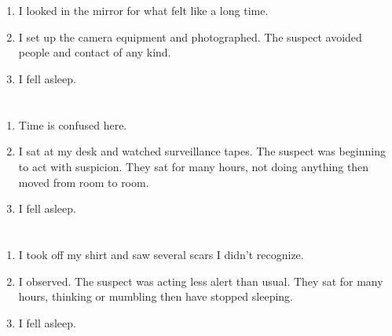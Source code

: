 \documentclass{article}
\begin{document}
    \newpage
    
    \section{}
    
    \begin{enumerate}
    
    \item I looked in the mirror for what felt like a long time.\\
    
    \item I set up the camera equipment and photographed. The suspect avoided people and contact of any kind.\\
    
    \item I fell asleep.\\
    
    \end{enumerate}
     
    \newpage
    
    \section{}
    
    \begin{enumerate}
    
    \item Time is confused here.\\
    
    \item I sat at my desk and watched surveillance tapes. The suspect was beginning to act with suspicion. They sat for many hours, not doing anything then moved from room to room.\\
    
    \item I fell asleep.\\
    
    \end{enumerate}
     
    \newpage
    
    \section{}
    
    \begin{enumerate}
    
    \item I took off my shirt and saw several scars I didn't recognize.\\
    
    \item I observed. The suspect was acting less alert than usual. They sat for many hours, thinking or mumbling then have stopped sleeping.\\
    
    \item I fell asleep.\\
    
    \end{enumerate}
     
\end{document}
